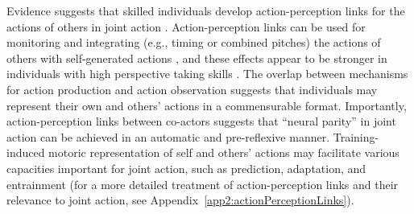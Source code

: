 \begin{CJK}{UTF8}{gbsn}
Evidence suggests that skilled individuals develop action-perception links for the actions of others in joint action \citep{Novembre2012}.  Action-perception links can be used for monitoring and integrating (e.g., timing or combined pitches) the actions of others with self-generated actions \citep{Loehr2013}, and these effects appear to be stronger in individuals with high perspective taking skills \citep{Novembre2012,Loehr2013}.  The overlap between mechanisms for action production and action observation suggests that individuals may represent their own and others’ actions in a commensurable format.   Importantly, action-perception links between co-actors suggests that ``neural parity'' \citep{Liberman2000} in joint action can be achieved in an automatic and pre-reflexive manner.  Training-induced motoric representation of self and others' actions may facilitate various capacities important for joint action, such as prediction, adaptation, and entrainment (for a more detailed treatment of action-perception links and their relevance to joint action, see Appendix~\ref{app2:actionPerceptionLinks}).


\end{CJK}
